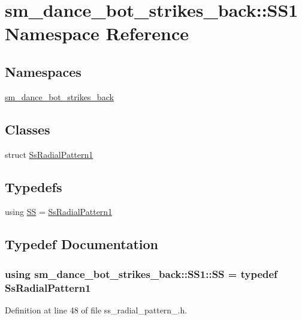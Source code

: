 \hypertarget{namespacesm__dance__bot__strikes__back_1_1SS1}{}\section{sm\+\_\+dance\+\_\+bot\+\_\+strikes\+\_\+back\+:\+:S\+S1 Namespace Reference}
\label{namespacesm__dance__bot__strikes__back_1_1SS1}
\subsection*{Namespaces}
\begin{DoxyCompactItemize}
\item 
 \hyperlink{namespacesm__dance__bot__strikes__back_1_1SS1_1_1sm__dance__bot__strikes__back}{sm\+\_\+dance\+\_\+bot\+\_\+strikes\+\_\+back}
\end{DoxyCompactItemize}
\subsection*{Classes}
\begin{DoxyCompactItemize}
\item 
struct \hyperlink{structsm__dance__bot__strikes__back_1_1SS1_1_1SsRadialPattern1}{Ss\+Radial\+Pattern1}
\end{DoxyCompactItemize}
\subsection*{Typedefs}
\begin{DoxyCompactItemize}
\item 
using \hyperlink{namespacesm__dance__bot__strikes__back_1_1SS1_ae3fc662548d76093fcfc00d91a5229d7}{SS} = \hyperlink{structsm__dance__bot__strikes__back_1_1SS1_1_1SsRadialPattern1}{Ss\+Radial\+Pattern1}
\end{DoxyCompactItemize}


\subsection{Typedef Documentation}
\subsubsection[{\texorpdfstring{SS}{SS}}]{\setlength{\rightskip}{0pt plus 5cm}using {\bf sm\+\_\+dance\+\_\+bot\+\_\+strikes\+\_\+back\+::\+S\+S1\+::\+SS} = typedef {\bf Ss\+Radial\+Pattern1}}\hypertarget{namespacesm__dance__bot__strikes__back_1_1SS1_ae3fc662548d76093fcfc00d91a5229d7}{}\label{namespacesm__dance__bot__strikes__back_1_1SS1_ae3fc662548d76093fcfc00d91a5229d7}


Definition at line 48 of file ss\+\_\+radial\+\_\+pattern\+\_.\+h.

